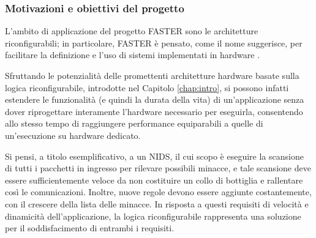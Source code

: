 \subsubsection{Motivazioni e obiettivi del progetto}
L'ambito di applicazione del progetto \ac{FASTER} sono le architetture 
riconfigurabili; in particolare, \ac{FASTER} è pensato, come il nome 
suggerisce, per facilitare la definizione e l'uso di sistemi implementati in 
hardware \cite{FasterPaper}.

Sfruttando le potenzialità delle promettenti architetture hardware basate sulla 
logica riconfigurabile, introdotte nel Capitolo \ref{chap:intro}, si possono 
infatti estendere le funzionalità (e quindi la durata della vita) di 
un'applicazione senza dover riprogettare interamente l'hardware necessario per 
eseguirla, consentendo allo stesso tempo di raggiungere performance equiparabili 
a quelle di un'esecuzione su hardware dedicato.

Si pensi, a titolo esemplificativo, a un \ac{NIDS}, il cui scopo è eseguire la 
scansione di tutti i pacchetti in ingresso per rilevare possibili minacce, e 
tale scansione deve essere sufficientemente veloce da non costituire un collo 
di bottiglia e rallentare così le comunicazioni. Inoltre, nuove regole devono 
essere aggiunte costantemente, con il crescere della lista delle minacce. In 
risposta a questi requisiti di velocità e dinamicità dell'applicazione, la 
logica riconfigurabile rappresenta una soluzione per il soddisfacimento di 
entrambi i requisiti.

% 


